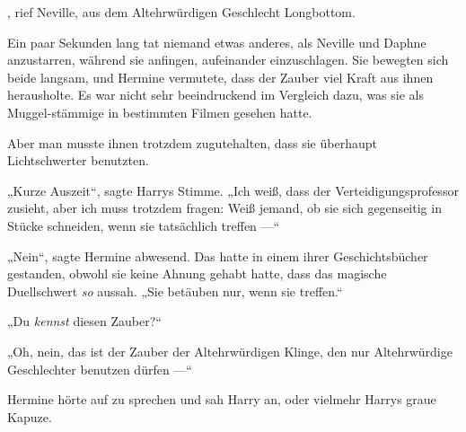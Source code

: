 , rief Neville, aus dem Altehrwürdigen Geschlecht Longbottom.  

\later

Ein paar Sekunden lang tat niemand etwas anderes, als Neville und Daphne anzustarren, während sie anfingen, aufeinander einzuschlagen. Sie bewegten sich beide langsam, und Hermine vermutete, dass der Zauber viel Kraft aus ihnen herausholte. Es war nicht sehr beeindruckend im Vergleich dazu, was sie als Muggel-stämmige in bestimmten Filmen gesehen hatte.

Aber man musste ihnen trotzdem zugutehalten, dass sie überhaupt Lichtschwerter benutzten.

„Kurze Auszeit“, sagte Harrys Stimme.
„Ich weiß, dass der Verteidigungsprofessor zusieht, aber ich muss trotzdem fragen: Weiß jemand, ob sie sich gegenseitig in Stücke schneiden, wenn sie tatsächlich treffen —“

„Nein“, sagte Hermine abwesend. Das hatte in einem ihrer Geschichtsbücher gestanden, obwohl sie keine Ahnung gehabt hatte, dass das magische Duellschwert \emph{so} aussah.
„Sie betäuben nur, wenn sie treffen.“

„Du \emph{kennst} diesen Zauber?“

„Oh, nein, das ist der Zauber der Altehrwürdigen Klinge, den nur Altehrwürdige Geschlechter benutzen dürfen —“

Hermine hörte auf zu sprechen und sah Harry an, oder vielmehr Harrys graue Kapuze.

